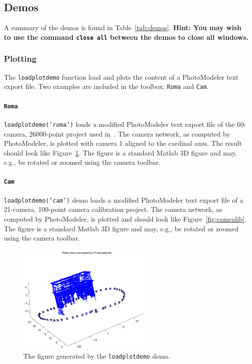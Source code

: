 \documentclass{article}
\begin{document}
\subsection{Demos}
\label{sec:demos}
A summary of the demos is found in Table~\ref{tab:demos}.
\textbf{Hint: You may wish to use the command \texttt{close all} between the demos to close
all windows.}

\subsubsection{Plotting}
\label{sec:loadplotdemo}
The \texttt{loadplotdemo} function load and plots the content of a
PhotoModeler text export file. Two examples are included in the
toolbox: \texttt{Roma} and \texttt{Cam}.

\paragraph{\texttt{Roma}}
\label{sec:org19232c3}

\texttt{loadplotdemo('roma')} loads a modified PhotoModeler text export file
of the 60-camera, 26000-point project used
in~\citet{Borlin2013:Bundle}. The camera network, as computed by
PhotoModeler, is plotted with camera 1 aligned to the cardinal axes.
The result should look like Figure~\ref{fig:roma}. The figure is a
standard Matlab 3D figure and may, e.g., be rotated or zoomed using
the camera toolbar.

\paragraph{\texttt{Cam}}
\label{sec:camcaldata}
\texttt{loadplotdemo('cam')} demo loads a modified PhotoModeler text export
file of a 21-camera, 100-point camera calibration project. The camera
network, as computed by PhotoModeler, is plotted and should look like
Figure~\ref{fig:camcalib}. The figure is a standard Matlab 3D figure and
may, e.g., be rotated or zoomed using the camera toolbar.


\begin{figure}[tbp]
\centering
\includegraphics[width=0.6\textwidth]{./ill/roma.pdf}
\caption{\label{fig:roma}
The figure generated by the \texttt{loadplotdemo} demo.}
\end{figure}
\end{document}
